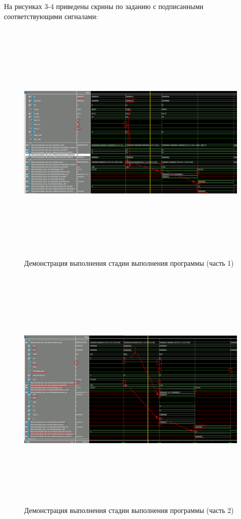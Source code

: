 На рисунках 3-4 приведены скрины по заданию с подписанными соответствующими сигналами:
\FloatBarrier
\begin{figure}[h]
	\begin{center}
		\includegraphics[width=\linewidth, height=12cm]{inc/third_ex_1.png}
	\end{center}
	\caption{Демонстрация выполнения стадии выполнения программы (часть 1)}
\end{figure}
\FloatBarrier

\FloatBarrier
\begin{figure}[h]
	\begin{center}
		\includegraphics[width=\linewidth, height=12cm]{inc/third_ex_2.png}
	\end{center}
	\caption{Демонстрация выполнения стадии выполнения программы (часть 2)}
\end{figure}
\FloatBarrier

